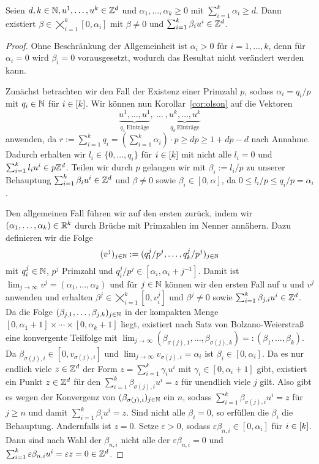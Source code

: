 \begin{lemma}
	Seien $d,k\in\mathbb{N}, u^1,\dots, u^k\in\mathbb{Z}^d$ und $\alpha_1,\dots,\alpha_k\geq0$ mit $\sum_{i=1}^k \alpha_i\geq d$.
	Dann existiert $\beta\in\bigtimes_{i=1}^k[0,\alpha_i]$ mit $\beta\neq0$ und $\sum_{i=1}^k\beta_i u^i \in\mathbb{Z}^d$.
\end{lemma}
\begin{proof}
	\newcommand{\bbeta}{\tilde{\beta}}
	Ohne Beschränkung der Allgemeinheit ist $\alpha_i>0$ für $i=1,\dots,k$, denn für $\alpha_i=0$ wird $\beta_i=0$ vorausgesetzt, wodurch das Resultat nicht verändert werden kann.
	
	Zunächst betrachten wir den Fall der Existenz einer Primzahl $p$, sodass   $\alpha_i=q_i / p$ mit $q_i\in\mathbb{N}$ für $i\in[k]$.
	Wir können nun Korollar~\ref{cor:olson} auf die Vektoren
	$$\underbrace{u^1,\dots,u^1}_{q_1~\text{Einträge}},~\dots~,\underbrace{u^k,\dots,u^k}_{q_k~\text{Einträge}}$$
	anwenden, da $r:=\sum_{i=1}^k q_i=(\sum_{i=1}^k \alpha_i)\cdot p\geq dp \geq 1+dp-d$ nach Annahme.
	Dadurch erhalten wir $l_i\in\{0,\dots,q_i\}$ für $i\in[k]$ mit nicht alle $l_i=0$ und $\sum_{i=1}^k l_i u^i\in p\mathbb{Z}^d$.
	Teilen wir durch $p$ gelangen wir mit $\beta_i := l_i/p$ zu unserer Behauptung $\sum_{i=1}^k \beta_i u^i\in\mathbb{Z}^d$ und $\beta\neq0$ sowie $\beta_i\in[0,\alpha]$, da $0\leq l_i/p\leq q_i/p=\alpha_i$.
	
	Den allgemeinen Fall führen wir auf den ersten zurück, indem wir $(\alpha_1,\dots,\alpha_k)\in\mathbb{R}^k$ durch Brüche mit Primzahlen im Nenner annähern.
	Dazu definieren wir die Folge 
	$$
	(v^j)_{j\in\mathbb{N}}:=(q^j_1/p^j,\dots,q^j_k/p^j)_{j\in\mathbb{N}}$$
	mit $q^j_i\in\mathbb{N}$, $p^j$ Primzahl und $q^j_i/p^j\in[\alpha_i, \alpha_i+j^{-1}]$.
	Damit ist $\lim_{j\rightarrow\infty}v^j=(\alpha_1,\dots,\alpha_k)$ und für $j\in\mathbb{N}$ können wir den ersten Fall auf $u$ und $v^j$ anwenden und erhalten $\beta^j\in\bigtimes_{i=1}^k[0,v^j_i]$ und $\beta^j\neq0$ sowie $\sum_{i=1}^k\beta_{j,i}u^i \in\mathbb{Z}^d$.
	Da die Folge $(\beta_{j,1},\dots,\beta_{j,k})_{j\in\mathbb{N}}$ in der kompakten Menge $[0,\alpha_1+1]\times\cdots\times[0,\alpha_k+1]$ liegt, existiert nach Satz von Bolzano-Weierstraß eine konvergente Teilfolge mit $\lim_{j\rightarrow\infty}(\beta_{\sigma(j),1},\dots,\beta_{\sigma(j),k})=:(\beta_1,\dots,\beta_k)$.
	Da $\beta_{\sigma(j),i}\in[0,v_{\sigma(j),i}]$ und $\lim_{j\rightarrow\infty}v_{\sigma(j),i}=\alpha_i$ ist $\beta_i\in[0,\alpha_i]$.
	Da es nur endlich viele $z\in\mathbb{Z}^d$ der Form $z=\sum_{i=1}^k\gamma_i u^i$ mit $\gamma_i\in[0,\alpha_i+1]$ gibt, existiert ein Punkt $z\in\mathbb{Z}^d$ für den $\sum_{i=1}^k \beta_{\sigma(j),i} u^i=z$ für unendlich viele $j$ gilt.
	Also gibt es wegen der Konvergenz von $(\beta_{\sigma(j),i})_{j\in\mathbb{N}}$ ein $n$, sodass $\sum_{i=1}^k\beta_{\sigma(j),i}u^i=z$ für $j\geq n$ und damit $\sum_{i=1}^k\beta_i u^i=z$.
	Sind nicht alle $\beta_i=0$, so erfüllen die $\beta_i$ die Behauptung.
	Andernfalls ist $z=0$.
	Setze $\varepsilon>0$, sodass $\varepsilon\beta_{n,i}\in[0,\alpha_i]$ für $i\in[k]$.
	Dann sind nach Wahl der $\beta_{n,i}$ nicht alle der $\varepsilon\beta_{n,i}=0$ und $\sum_{i=1}^k\varepsilon\beta_{n,i}u^i=\varepsilon z=0\in\mathbb{Z}^d$.
\end{proof}

